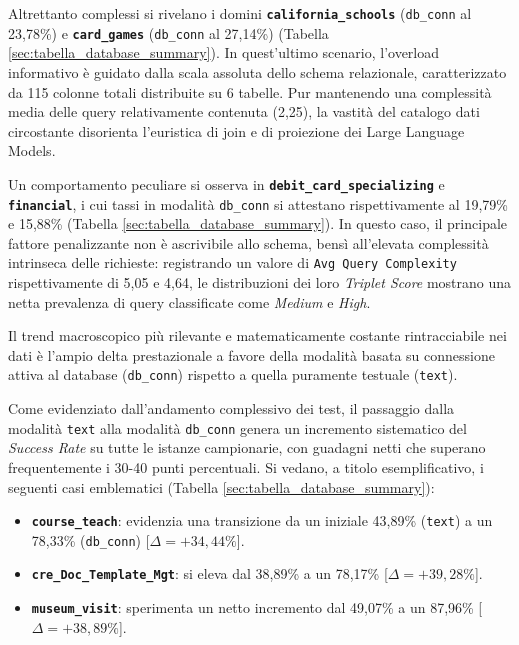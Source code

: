 Altrettanto complessi si rivelano i domini
\textbf{\texttt{california\_schools}} (\texttt{db\_conn} al 23,78\%) e
\textbf{\texttt{card\_games}} (\texttt{db\_conn} al 27,14\%) (Tabella
\ref{sec:tabella_database_summary}). In quest'ultimo scenario, l'overload informativo è guidato dalla
scala assoluta dello schema relazionale, caratterizzato da 115
colonne totali distribuite su 6 tabelle. Pur mantenendo una complessità
media delle query relativamente contenuta (2,25), la vastità del
catalogo dati circostante disorienta l'euristica di join e di proiezione
dei Large Language Models.

Un comportamento peculiare si osserva in
\textbf{\texttt{debit\_card\_specializing}} e
\textbf{\texttt{financial}}, i cui tassi in modalità \texttt{db\_conn}
si attestano rispettivamente al 19,79\% e 15,88\% (Tabella \ref{sec:tabella_database_summary}). In
questo caso, il principale fattore penalizzante non è ascrivibile allo
schema, bensì all'elevata complessità intrinseca delle richieste:
registrando un valore di \texttt{Avg\ Query\ Complexity} rispettivamente
di 5,05 e 4,64, le distribuzioni dei loro
\emph{Triplet Score} mostrano una netta prevalenza di query classificate
come \emph{Medium} e \emph{High}.

Il trend macroscopico più rilevante e matematicamente costante
rintracciabile nei dati è l'ampio delta prestazionale a favore della
modalità basata su connessione attiva al database (\texttt{db\_conn})
rispetto a quella puramente testuale (\texttt{text}).

Come evidenziato dall'andamento complessivo dei test, il passaggio dalla
modalità \texttt{text} alla modalità \texttt{db\_conn} genera un
incremento sistematico del \emph{Success Rate} su tutte le istanze
campionarie, con guadagni netti che superano frequentemente i
30-40 punti percentuali. Si vedano, a titolo esemplificativo, i
seguenti casi emblematici (Tabella \ref{sec:tabella_database_summary}):

\begin{itemize}
\item
  \textbf{\texttt{course\_teach}}: evidenzia una transizione da un
  iniziale 43,89\% (\texttt{text}) a un 78,33\%
  (\texttt{db\_conn}) {[}\(\Delta = +34,44\%\){]}.
\item
  \textbf{\texttt{cre\_Doc\_Template\_Mgt}}: si eleva dal 38,89\% a un
  78,17\% {[}\(\Delta = +39,28\%\){]}.
\item
  \textbf{\texttt{museum\_visit}}: sperimenta un netto incremento dal
  49,07\% a un 87,96\% {[}\(\Delta = +38,89\%\){]}.
\end{itemize}

